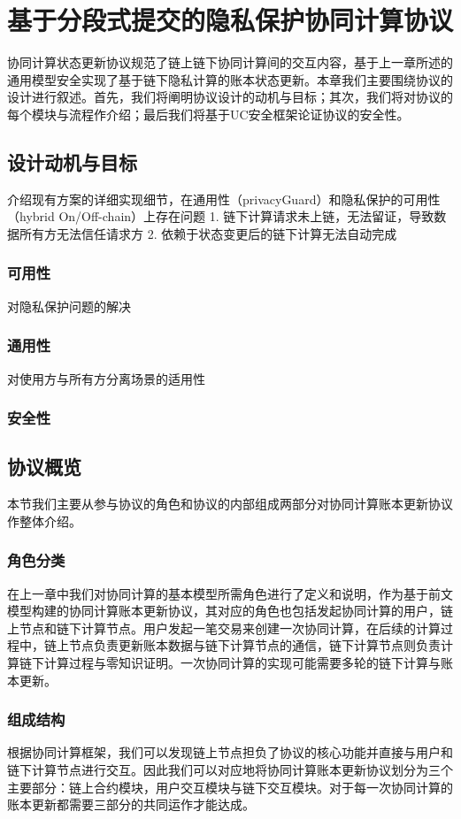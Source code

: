 \chapter{基于分段式提交的隐私保护协同计算协议}
协同计算状态更新协议规范了链上链下协同计算间的交互内容，基于上一章所述的通用模型安全实现了基于链下隐私计算的账本状态更新。本章我们主要围绕协议的设计进行叙述。首先，我们将阐明协议设计的动机与目标；其次，我们将对协议的每个模块与流程作介绍；最后我们将基于UC安全框架论证协议的安全性。
\section{设计动机与目标}
介绍现有方案的详细实现细节，在通用性（privacyGuard）和隐私保护的可用性（hybrid On/Off-chain）上存在问题
1. 链下计算请求未上链，无法留证，导致数据所有方无法信任请求方
2. 依赖于状态变更后的链下计算无法自动完成
\subsection{可用性}
对隐私保护问题的解决

\subsection{通用性}
对使用方与所有方分离场景的适用性

\subsection{安全性}


\section{协议概览}
本节我们主要从参与协议的角色和协议的内部组成两部分对协同计算账本更新协议作整体介绍。
\subsection{角色分类}
在上一章中我们对协同计算的基本模型所需角色进行了定义和说明，作为基于前文模型构建的协同计算账本更新协议，其对应的角色也包括发起协同计算的用户，链上节点和链下计算节点。用户发起一笔交易来创建一次协同计算，在后续的计算过程中，链上节点负责更新账本数据与链下计算节点的通信，链下计算节点则负责计算链下计算过程与零知识证明。一次协同计算的实现可能需要多轮的链下计算与账本更新。

\subsection{组成结构}
根据协同计算框架，我们可以发现链上节点担负了协议的核心功能并直接与用户和链下计算节点进行交互。因此我们可以对应地将协同计算账本更新协议划分为三个主要部分：链上合约模块，用户交互模块与链下交互模块。对于每一次协同计算的账本更新都需要三部分的共同运作才能达成。

